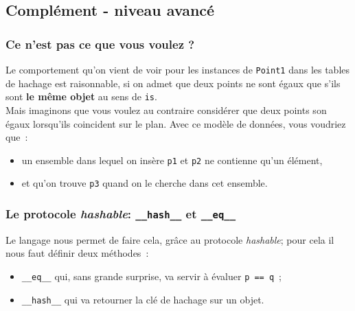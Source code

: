    \hypertarget{compluxe9ment---niveau-avancuxe9}{%
\subsection{Complément - niveau
avancé}\label{compluxe9ment---niveau-avancuxe9}}

    \hypertarget{ce-nest-pas-ce-que-vous-voulez}{%
\subsubsection{Ce n'est pas ce que vous voulez
?}\label{ce-nest-pas-ce-que-vous-voulez}}

    Le comportement qu'on vient de voir pour les instances de
\texttt{Point1} dans les tables de hachage est raisonnable, si on admet
que deux points ne sont égaux que s'ils sont \textbf{le même objet} au
sens de \texttt{is}.\\

    Mais imaginons que vous voulez au contraire considérer que deux points
son égaux lorsqu'ils coincident sur le plan. Avec ce modèle de données,
vous voudriez que~:

\begin{itemize}
\tightlist
\item
  un ensemble dans lequel on insère \texttt{p1} et \texttt{p2} ne
  contienne qu'un élément,
\item
  et qu'on trouve \texttt{p3} quand on le cherche dans cet ensemble.
\end{itemize}

    \hypertarget{le-protocole-hashable-__hash__-et-__eq__}{%
\subsubsection{\texorpdfstring{Le protocole \emph{hashable}:
\texttt{\_\_hash\_\_} et
\texttt{\_\_eq\_\_}}{Le protocole hashable: \_\_hash\_\_ et \_\_eq\_\_}}\label{le-protocole-hashable-__hash__-et-__eq__}}

    Le langage nous permet de faire cela, grâce au protocole
\emph{hashable}; pour cela il nous faut définir deux méthodes~:

\begin{itemize}
\tightlist
\item
  \texttt{\_\_eq\_\_} qui, sans grande surprise, va servir à évaluer
  \texttt{p\ ==\ q}~;
\item
  \texttt{\_\_hash\_\_} qui va retourner la clé de hachage sur un objet.
\end{itemize}

